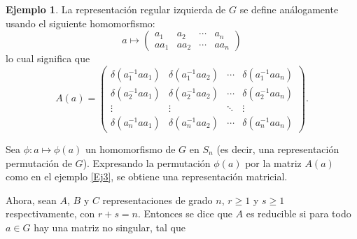 \documentclass[12pt]{book}
\theoremstyle{definition}
\newtheorem{example}[theorem]{Ejemplo}
\newcounter{in}
\begin{document}
\begin{example}
  La representación regular izquierda de $G$ se define análogamente
  usando el siguiente homomorfismo:
  \begin{equation*}
    a \mapsto
    \begin{pmatrix}
      a_{1} & a_{2} & \cdots  & a_{n}\\ 
      aa_{1} & aa_{2} & \cdots & aa_{n}
    \end{pmatrix}
  \end{equation*}
  lo cual significa que
  \begin{equation}
    \label{eq:8}
    A\left(a\right) = 
    \begin{pmatrix}
      \delta\left(a_{1}^{-1}aa_{1}\right) & \delta\left(a_{1}^{-1}aa_{2}\right) & \cdots  & \delta\left(a_{1}^{-1}aa_{n}\right)\\
      \delta\left(a_{2}^{-1}aa_{1}\right) & \delta\left(a_{2}^{-1}aa_{2}\right) & \cdots  & \delta\left(a_{2}^{-1}aa_{n}\right)\\ 
      \vdots & \vdots & \ddots & \vdots\\
      \delta\left(a_{n}^{-1}aa_{1}\right) & \delta\left(a_{n}^{-1}aa_{2}\right) & \cdots  & \delta\left(a_{n}^{-1}aa_{n}\right)
    \end{pmatrix}
    .
  \end{equation}
\end{example}

Sea $\phi \colon a \mapsto \phi\left(a\right)$ un homomorfismo de $G$
en $S_{n}$ (es decir, una representación permutación de
$G$). Expresando la permutación $\phi\left(a\right)$ por la matriz
$A\left(a\right)$ como en el ejemplo \ref{Ej3}, se obtiene una
representación matricial.

Ahora, sean $A$, $B$ y $C$ representaciones de grado $n$,
$r \geq 1$ y $s \geq 1$ respectivamente, con $r+s=n$. Entonces se dice
que $A$ es reducible si para todo $a \in G$ hay una matriz no
singular, tal que
\end{document}
